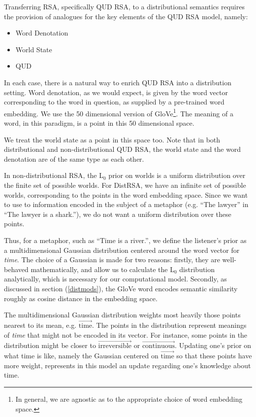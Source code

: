 \documentclass[10pt,letterpaper,twocolumn]{article}
\begin{document}
Transferring RSA, specifically QUD RSA, to a distributional semantics requires the provision of analogues for the key elements of the QUD RSA model, namely:

	\begin{itemize}
	\item Word Denotation
	\item World State
	\item QUD
	\end{itemize}

In each case, there is a natural way to enrich QUD RSA into a distribution setting. Word denotation, as we would expect, is given by the word vector corresponding to the word in question, as supplied by a pre-trained word embedding. We use the 50 dimensional version of GloVe\footnote{In general, we are agnostic as to the appropriate choice of word embedding space.}. The meaning of a word, in this paradigm, is a point in this 50 dimensional space.

We treat the world state as a point in this space too. Note that in both distributional and non-distributional QUD RSA, the world state and the word denotation are of the same type as each other.

In non-distributional RSA, the L$_0$ prior on worlds is a uniform distribution over the finite set of possible worlds. For DistRSA, we have an infinite set of possible worlds, corresponding to the points in the word embedding space. Since we want to use to information encoded in the subject of a metaphor (e.g. ``The lawyer'' in ``The lawyer is a shark.''), we do not want a uniform distribution over these points.

Thus, for a metaphor, such as ``Time is a river.'', we define the listener's prior as a multidimensional Gaussian distribution centered around the word vector for \emph{time}. The choice of a Gaussian is made for two reasons: firstly, they are well-behaved mathematically, and allow us to calculate the L$_0$ distribution analytically, which is necessary for our computational model. Secondly, as discussed in section (\ref{distmods}), the GloVe word encodes semantic similarity roughly as cosine distance in the embedding space. 

The multidimensional Gaussian distribution weights most heavily those points nearest to its mean, e.g. $\overrightarrow{\text{time}}$. The points in the distribution represent meanings of \emph{time} that might not be encoded in its vector. For instance, some points in the distribution might be closer to $\overrightarrow{\text{irreversible}}$ or $\overrightarrow{\text{continuous}}$. Updating one's prior on what time is like, namely the Gaussian centered on $\overrightarrow{\text{time}}$ so that these points have more weight, represents in this model an update regarding one's knowledge about time.
\end{document}
